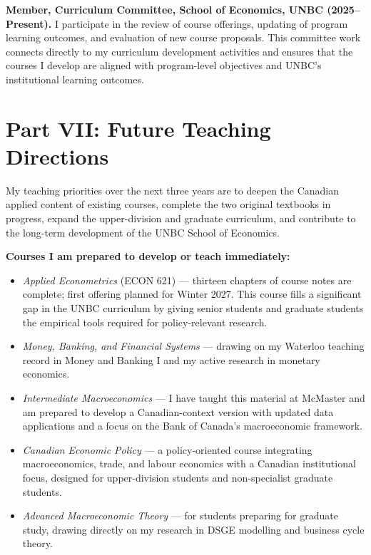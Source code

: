 \documentclass[11pt,letterpaper]{article}
\begin{document}
\textbf{Member, Curriculum Committee, School of Economics, UNBC (2025--Present).}
I participate in the review of course offerings, updating of program learning outcomes, and evaluation of new course proposals. This committee work connects directly to my curriculum development activities and ensures that the courses I develop are aligned with program-level objectives and UNBC's institutional learning outcomes.

\section{Part VII: Future Teaching Directions}

My teaching priorities over the next three years are to deepen the Canadian applied content of existing courses, complete the two original textbooks in progress, expand the upper-division and graduate curriculum, and contribute to the long-term development of the UNBC School of Economics.

\textbf{Courses I am prepared to develop or teach immediately:}

\begin{itemize}
  \item \textit{Applied Econometrics} (ECON 621) --- thirteen chapters of course notes are complete; first offering planned for Winter 2027. This course fills a significant gap in the UNBC curriculum by giving senior students and graduate students the empirical tools required for policy-relevant research.
  \item \textit{Money, Banking, and Financial Systems} --- drawing on my Waterloo teaching record in Money and Banking I and my active research in monetary economics.
  \item \textit{Intermediate Macroeconomics} --- I have taught this material at McMaster and am prepared to develop a Canadian-context version with updated data applications and a focus on the Bank of Canada's macroeconomic framework.
  \item \textit{Canadian Economic Policy} --- a policy-oriented course integrating macroeconomics, trade, and labour economics with a Canadian institutional focus, designed for upper-division students and non-specialist graduate students.
  \item \textit{Advanced Macroeconomic Theory} --- for students preparing for graduate study, drawing directly on my research in DSGE modelling and business cycle theory.
\end{itemize}
\end{document}
